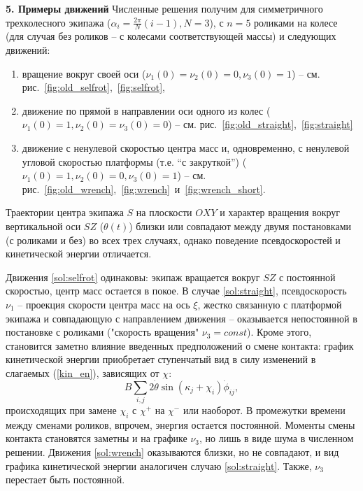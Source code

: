
{\bf 5. Примеры движений}
Численные решения получим для симметричного трехколесного экипажа ($\alpha_i = \frac{2\pi}{N}(i - 1), N = 3$), с $n = 5$ роликами на колесе (для случая без роликов -- с колесами соответствующей массы) и следующих движений:
\begin{enumerate}
  \item \label{sol:selfrot} вращение вокруг своей оси ($\nu_1(0) = \nu_2(0) = 0, \nu_3(0) = 1$) -- см. рис.~\ref{fig:old_selfrot},~\ref{fig:selfrot},
  \item \label{sol:straight} движение по прямой в направлении оси одного из колес ($\nu_1(0) = 1, \nu_2(0) = \nu_3(0) = 0$) -- см. рис.~\ref{fig:old_straight},~\ref{fig:straight}
  \item \label{sol:wrench} движение с ненулевой скоростью центра масс и, одновременно, с ненулевой угловой скоростью платформы (т.е. ``с закруткой'') ($\nu_1(0) = 1, \nu_2(0) = 0, \nu_3(0) = 1$) -- см. рис.~\ref{fig:old_wrench},~\ref{fig:wrench}~и~\ref{fig:wrench_short}.
\end{enumerate}

Траектории центра экипажа $S$ на плоскости $OXY$ и характер вращения вокруг вертикальной оси $SZ$ ($\theta(t)$) близки или совпадают между двумя постановками (с роликами и без) во всех трех случаях, однако поведение псевдоскоростей и кинетической энергии отличается.

Движения \ref{sol:selfrot} одинаковы: экипаж вращается вокруг $SZ$ с постоянной скоростью, центр масс остается в покое. В случае \ref{sol:straight}, псевдоскорость $\nu_1$ -- проекция скорости центра масс на ось $\xi$, жестко связанную с платформой экипажа и совпадающую с направлением движения -- оказывается непостоянной в постановке с роликами ("скорость вращения" $\nu_3 = const$). Кроме этого, становится заметно влияние введенных предположений о смене контакта: график кинетической энергии приобретает ступенчатый вид в силу изменений в слагаемых (\ref{kin_en}), зависящих от $\chi$: 
$$B\sum_{i,j}2\dot{\theta}\sin(\kappa_j + \chi_i)\dot{\phi}_{ij},$$
происходящих при замене $\chi_i$ с $\chi^+$ на $\chi^-$ или наоборот. В промежутки времени между сменами роликов, впрочем, энергия остается постоянной. Моменты смены контакта становятся заметны и на графике $\nu_3$, но лишь в виде шума в численном решении. Движения \ref{sol:wrench} оказываются близки, но не совпадают, и вид графика кинетической энергии аналогичен случаю \ref{sol:straight}. Также, $\nu_3$ перестает быть постоянной.